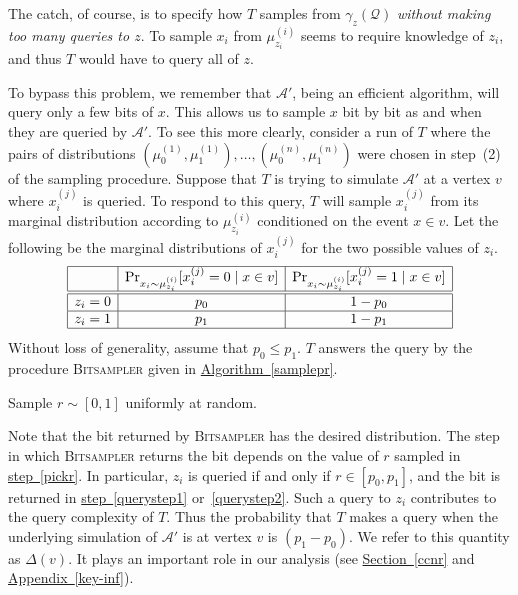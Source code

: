 \documentclass[11pt]{article}
\numberwithin{equation}{section}
\theoremstyle{definition}
\theoremstyle{plain}
\newcommand{\expref}[2]{\hyperref[#2]{#1~\ref{#2}}}
\newcommand{\clQ}{\mathcal{Q}}
\begin{document}
The catch, of course, is to specify how $T$ samples from $\gamma_z(\clQ)$ \emph{without making too many queries to $z$}.  To sample $x_i$ from $\mu_{z_i}^{(i)}$ seems to require knowledge of $z_i$, and 
thus $T$ would have to query all of $z$.

To bypass this problem, we remember that $\mathcal{A}'$, being an efficient algorithm, will query only a few bits of $x$. This allows us to sample $x$ bit by bit as and when they are queried by $\mathcal{A}'$.
To see this more clearly, consider a run of $T$ where the pairs of distributions $(\mu_0^{(1)}, \mu_1^{(1)}), \ldots, (\mu_0^{(n)}, \mu_1^{(n)})$ were chosen in step~(2) of the sampling procedure.  
Suppose that $T$ is trying to simulate $\mathcal{A'}$ at a vertex $v$ where $x_i^{(j)}$ is queried.  To respond to this query, $T$ will sample $x_i^{(j)}$ from its marginal distribution according to $\mu_{z_i}^{(i)}$ conditioned on the 
event $x \in v$. Let the following be the marginal distributions of $x_i^{(j)}$ for the two possible values of $z_i$.
\[\begin{array}{|c|c|c|}
\hline
& \Pr_{x_i \sim \mu_{z_i}^{(i)}} [x_i^{(j)}=0 \mid x \in v]&\Pr_{x_i \sim \mu_{z_i}^{(i)}} [x_i^{(j)}=1 \mid x \in v] \\
\hline \hline
z_i=0 & p_0 & 1-p_0 \\
\hline
z_i=1& p_1 & 1-p_1 \\
\hline
\end{array}
\]
Without loss of generality, assume that $p_0 \leq p_1$. $T$ answers the query by the procedure \textsc{Bitsampler} given in \expref{Algorithm}{samplepr}.
\begin{algorithm}[!h]
\DontPrintSemicolon
\caption{ \textsc{Bitsampler} (suppose $p_0 \leq p_1$)}
\label{samplepr}
Sample $r \sim [0,1]$ uniformly at random.\label{pickr} \;
 \;
\;
\end{algorithm}
Note that the bit returned by \textsc{Bitsampler} has the desired distribution. The step in which \textsc{Bitsampler} returns the bit depends on the value of $r$ sampled in \expref{step}{pickr}. In particular, $z_i$ is queried if and only if $r \in [p_0,p_1]$, and the bit is returned in \expref{step}{querystep1} or~\ref{querystep2}. Such a query to $z_i$ contributes to the query complexity of $T$. Thus the probability that $T$ makes a query when the underlying simulation of $\mathcal{A}'$ is at vertex $v$ is $(p_1-p_0)$. We refer to this quantity as $\Delta(v)$. It plays an important role in our analysis (see \expref{Section}{ccnr} and \expref{Appendix}{key-inf}).
\end{document}
